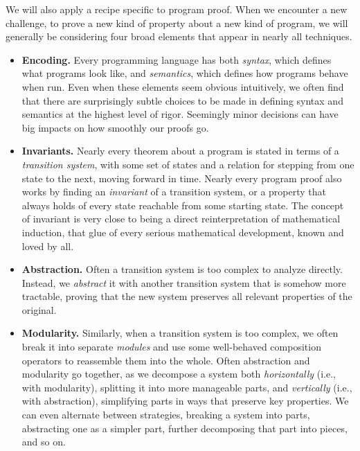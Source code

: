 \documentclass{amsbook}
\theoremstyle{definition}
\theoremstyle{remark}
\numberwithin{section}{chapter}
\numberwithin{equation}{chapter}
\begin{document}
We will also apply a recipe specific to program proof.
When we encounter a new challenge, to prove a new kind of property about a new kind of program, we will generally be considering four broad elements that appear in nearly all techniques.

\begin{itemize}
  \item {}\textbf{Encoding.}
    Every programming language has both \emph{syntax}, which defines what programs look like, and \emph{semantics}, which defines how programs behave when run.
    Even when these elements seem obvious intuitively, we often find that there are surprisingly subtle choices to be made in defining syntax and semantics at the highest level of rigor.
    Seemingly minor decisions can have big impacts on how smoothly our proofs go.

  \item \textbf{Invariants.}
    Nearly every theorem about a program is stated in terms of a \emph{transition system}, with some set of states and a relation for stepping from one state to the next, moving forward in time.
    Nearly every program proof also works by finding an \emph{invariant} of a transition system, or a property that always holds of every state reachable from some starting state.
    The concept of invariant is very close to being a direct reinterpretation of mathematical induction, that glue of every serious mathematical development, known and loved by all.

  \item {}\textbf{Abstraction.}
    Often a transition system is too complex to analyze directly.
    Instead, we \emph{abstract} it with another transition system that is somehow more tractable, proving that the new system preserves all relevant properties of the original.

  \item {}\textbf{Modularity.}
    Similarly, when a transition system is too complex, we often break it into separate \emph{modules} and use some well-behaved composition operators to reassemble them into the whole.
    Often abstraction and modularity go together, as we decompose a system both \emph{horizontally} (i.e., with modularity), splitting it into more manageable parts, and \emph{vertically} (i.e., with abstraction), simplifying parts in ways that preserve key properties.
    We can even alternate between strategies, breaking a system into parts, abstracting one as a simpler part, further decomposing that part into pieces, and so on.
\end{itemize}
\end{document}
